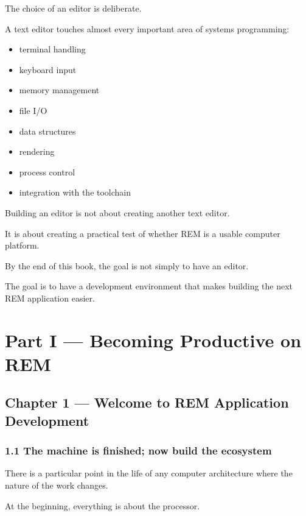 \documentclass[
  oneside,
  openany]{book}
\providecommand{\tightlist}{%
  \setlength{\itemsep}{0pt}\setlength{\parskip}{0pt}}
\begin{document}
The choice of an editor is deliberate.

A text editor touches almost every important area of systems
programming:

\begin{itemize}
\tightlist
\item
  terminal handling
\item
  keyboard input
\item
  memory management
\item
  file I/O
\item
  data structures
\item
  rendering
\item
  process control
\item
  integration with the toolchain
\end{itemize}

Building an editor is not about creating another text editor.

It is about creating a practical test of whether REM is a usable
computer platform.

By the end of this book, the goal is not simply to have an editor.

The goal is to have a development environment that makes building the
next REM application easier.

\part{Part I — Becoming Productive on REM}

\hypertarget{chapter-1-welcome-to-rem-application-development}{%
\chapter{Chapter 1 --- Welcome to REM Application
Development}\label{chapter-1-welcome-to-rem-application-development}}

\hypertarget{the-machine-is-finished-now-build-the-ecosystem}{%
\section{1.1 The machine is finished; now build the
ecosystem}\label{the-machine-is-finished-now-build-the-ecosystem}}

There is a particular point in the life of any computer architecture
where the nature of the work changes.

At the beginning, everything is about the processor.
\end{document}
